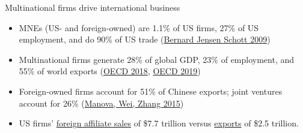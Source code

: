 \documentclass[11pt,notes=hide,aspectratio=169]{beamer}
\begin{document}
\begin{frame}{Multinational firms drive international business}
\begin{itemize}
\item MNEs {\small (US- and foreign-owned)} are 1.1\% of US firms, 27\% of US employment, and do 90\% of US trade {\footnotesize(\href{http://www.nber.org/chapters/c0500}{Bernard Jensen Schott 2009})}
\item Multinational firms generate 28\% of global GDP, 23\% of employment, and 55\% of world exports
{\footnotesize(\href{https://www.oecd.org/industry/ind/MNEs-in-the-global-economy-policy-note.pdf}{OECD 2018}, \href{https://www.oecd-ilibrary.org/science-and-technology/multinational-enterprises-in-domestic-value-chains_9abfa931-en}{OECD 2019})}
\item Foreign-owned firms account for 51\% of Chinese exports; joint ventures account for 26\% {\footnotesize(\href{http://users.ox.ac.uk/~econ0451/ChinaCredit.pdf}{Manova, Wei, Zhang 2015})}
\item US firms' \href{https://apps.bea.gov/iTable/iTable.cfm?ReqID=2&step=1}{foreign affiliate sales} of \$7.7 trillion versus \href{https://www.census.gov/foreign-trade/statistics/highlights/annual.html}{exports} of \$2.5 trillion.
\end{itemize}
\begin{center}
\end{center}
\end{frame}
\end{document}
